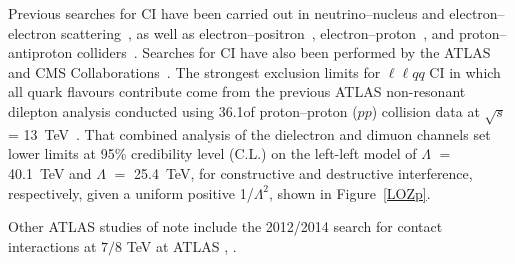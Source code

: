 Previous searches for CI have been carried out in neutrino--nucleus and electron--electron scattering~\cite{Anthony:2005pm}, as well as electron--positron~\cite{Abdallah:2008ab, Schael:2006wu}, electron--proton~\cite{Aaron:2011mv}, and proton--antiproton colliders~\cite{Abulencia:2006iv,Abazov:2009ac}. Searches for CI have also been performed by the ATLAS and CMS Collaborations~\cite{Aad:2014wca, Khachatryan:2014fba}. The strongest exclusion limits for $\ell\ell q q$ CI in which all quark flavours contribute come from the previous ATLAS non-resonant dilepton analysis conducted using 36.1\fb of proton--proton ($pp$) collision data at $\sqrt{s}$ = 13~TeV~\cite{Aaboud:2016cth}. That combined analysis of the dielectron and dimuon channels set lower limits at 95\% credibility level (C.L.) on the left-left model of $\Lambda$ $=$ 40.1~TeV and $\Lambda$ $=$ 25.4~TeV, for constructive and destructive interference, respectively, given a uniform positive 1/$\Lambda^2$, shown in Figure~\ref{LOZp}.

Other ATLAS studies of note include the 2012/2014 search for contact interactions at $7/8$ TeV at ATLAS \cite{EXOT-2013-19}, \cite{EXOT-2012-17}.


